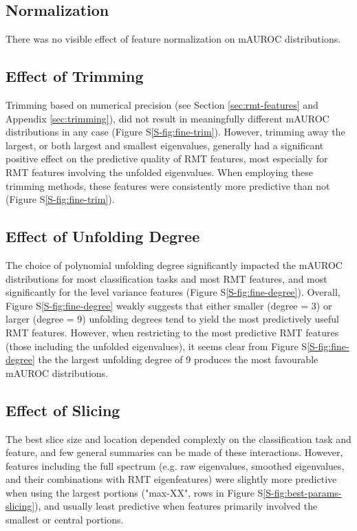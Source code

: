 \documentclass[12pt]{spieman}  %
\begin{document}
\begin{spacing}{2}
\subsection{Normalization}
There was no visible effect of feature normalization on mAUROC distributions.


\subsection{Effect of Trimming}
Trimming based on numerical precision (see Section \ref{sec:rmt-features} and
Appendix \ref{sec:trimming}), did not result in meaningfully different mAUROC
distributions in any case (Figure S\ref{S-fig:fine-trim}). However, trimming
away the largest, or both largest and smallest eigenvalues, generally had a
significant positive effect on the predictive quality of RMT features, most
especially for RMT features involving the unfolded eigenvalues. When employing
these trimming methods, these features were consistently more predictive than
not (Figure S\ref{S-fig:fine-trim}).

\subsection{Effect of Unfolding Degree}
The choice of polynomial unfolding degree significantly impacted the mAUROC
distributions for most classification tasks and most RMT features, and most
significantly for the level variance features (Figure
S\ref{S-fig:fine-degree}). Overall, Figure S\ref{S-fig:fine-degree} weakly
suggests that either smaller (degree = 3) or larger (degree = 9) unfolding
degrees tend to yield the most predictively useful RMT features. However, when
restricting to the most predictive RMT features (those including the unfolded
eigenvalues), it seems clear from Figure S\ref{S-fig:fine-degree} the the
largest unfolding degree of 9 produces the most favourable mAUROC
distributions.

\subsection{Effect of Slicing}
The best slice size and location depended complexly on the classification task
and feature, and few general summaries can be made of these interactions.
However, features including the full spectrum (e.g. raw eigenvalues, smoothed
eigenvalues, and their combinations with RMT eigenfeatures) were slightly more
predictive when using the largest portions ("max-XX", rows in Figure
S\ref{S-fig:best-params-slicing}), and usually least predictive when features
primarily involved the smallest or central portions.


\end{spacing}
\end{document}
